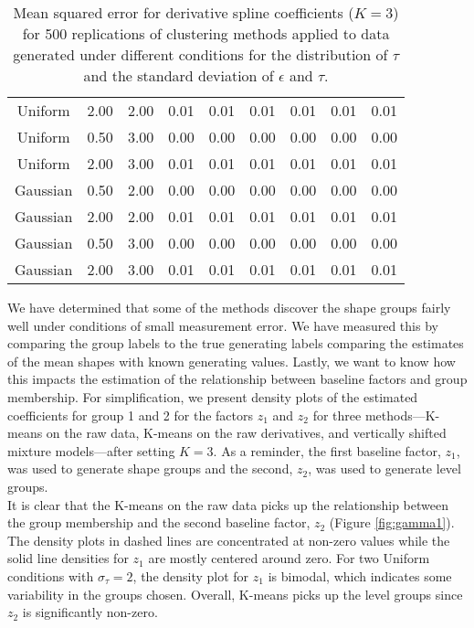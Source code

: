 \documentclass[12pt]{article}
\begin{document}
\begin{table}[ht]
\begin{center}
\begin{tabular}{ccc|cccccc}
  Uniform & 2.00 & 2.00 & 0.01 & 0.01 & 0.01 & 0.01 & 0.01 & 0.01 \\ 
  Uniform & 0.50 & 3.00 & 0.00 & 0.00 & 0.00 & 0.00 & 0.00 & 0.00 \\ 
  Uniform & 2.00 & 3.00 & 0.01 & 0.01 & 0.01 & 0.01 & 0.01 & 0.01 \\ 
  Gaussian & 0.50 & 2.00 & 0.00 & 0.00 & 0.00 & 0.00 & 0.00 & 0.00 \\ 
  Gaussian & 2.00 & 2.00 & 0.01 & 0.01 & 0.01 & 0.01 & 0.01 & 0.01 \\ 
  Gaussian & 0.50 & 3.00 & 0.00 & 0.00 & 0.00 & 0.00 & 0.00 & 0.00 \\ 
  Gaussian & 2.00 & 3.00 & 0.01 & 0.01 & 0.01 & 0.01 & 0.01 & 0.01 \\ 
   \hline\end{tabular}
\caption{Mean squared error for derivative spline coefficients ($K=3$) for 500 replications of clustering methods applied to data generated under different conditions for the distribution of $\tau$ and the standard deviation of $\epsilon$ and $\tau$.}
\label{tab:mse3}
\end{center}
\end{table}

We have determined that some of the methods discover the shape groups fairly well under conditions of small measurement error. We have measured this by comparing the group labels to the true generating labels comparing the estimates of the mean shapes with known generating values. Lastly, we want to know how this impacts the estimation of the relationship between baseline factors and group membership. For simplification, we present density plots of the estimated coefficients for group 1 and 2 for the factors $z_{1}$ and $z_{2}$ for three methods---K-means on the raw data, K-means on the raw derivatives, and vertically shifted mixture models---after setting $K=3$. As a reminder, the first baseline factor, $z_{1}$, was used to generate shape groups and the second, $z_{2}$, was used to generate level groups. \\

It is clear that the K-means on the raw data picks up the relationship between the group membership and the second baseline factor, $z_{2}$ (Figure \ref{fig:gamma1}). The density plots in dashed lines are concentrated at non-zero values while the solid line densities for $z_{1}$ are mostly centered around zero. For two Uniform conditions with $\sigma_{\tau}=2$, the density plot for $z_{1}$ is bimodal, which indicates some variability in the groups chosen. Overall, K-means picks up the level groups since $z_{2}$ is significantly non-zero.\\
\end{document}
